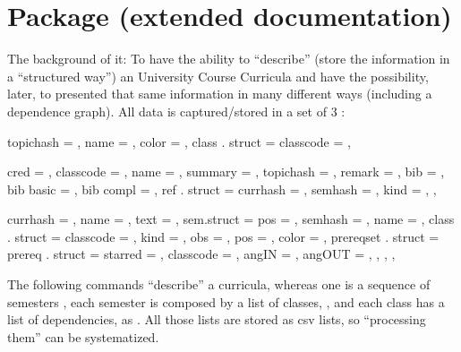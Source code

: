 \documentclass[article,nofontwarning,nogeometry,english,tocdepth=3,secdepth=3]{ufrgscca} %
\begin{document}
\section{ Package (extended documentation)}
The background of it: To have the ability to “describe” (store the information in a “structured way”) an University Course Curricula and  have the possibility, later, to presented that same information in many different ways (including a dependence graph).  All data is captured/stored in a set of 3 :


\begin{codestore}[st=topicsdef]
  {
    topichash  = ,
    name = ,
    color = ,
    class . struct = {
      classcode = ,
    }
  }
\end{codestore}

\label{topics-def}


\begin{codestore}[st=classdef]
  {
   cred = ,
   classcode = ,
   name = ,
   summary = ,
   topichash = ,
   remark = ,
   bib = ,
   bib basic = ,
   bib compl = ,
   ref . struct = {
     currhash = ,
     semhash = ,
     kind = ,
   } ,
  }
\end{codestore}

\label{class-def}

\begin{codestore}[st=curriculadef]
  {
    currhash = ,
    name = ,
    text = ,
    sem.struct = {
      pos = ,
      semhash = ,
      name = ,
      class . struct = {
        classcode = ,
        kind = ,
        obs = ,
        pos = ,
        color = ,
        prereqset . struct = {
          prereq . struct = {
            starred = ,
            classcode = ,
            angIN = ,
            angOUT = ,
          }
        } ,
      } ,
    } ,
  }
\end{codestore}

\label{curricula-def}


The following commands “describe” a curricula, whereas one is a sequence of semesters , each semester is composed by a list of classes, , and each class has a list of dependencies,  as \tsmacro{\depdef}{}. All those lists are stored as csv lists, so “processing them” can be systematized.
\end{document}
